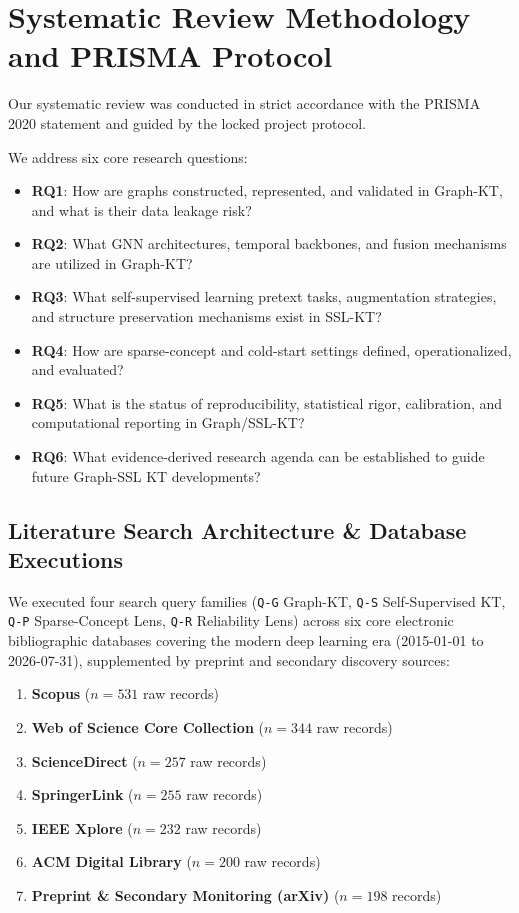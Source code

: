 \documentclass[10pt,journal,compsoc]{IEEEtran}
\begin{document}
\section{Systematic Review Methodology and PRISMA Protocol}
Our systematic review was conducted in strict accordance with the PRISMA 2020 statement and guided by the locked project protocol.

We address six core research questions:
\begin{itemize}
    \item \textbf{RQ1}: How are graphs constructed, represented, and validated in Graph-KT, and what is their data leakage risk?
    \item \textbf{RQ2}: What GNN architectures, temporal backbones, and fusion mechanisms are utilized in Graph-KT?
    \item \textbf{RQ3}: What self-supervised learning pretext tasks, augmentation strategies, and structure preservation mechanisms exist in SSL-KT?
    \item \textbf{RQ4}: How are sparse-concept and cold-start settings defined, operationalized, and evaluated?
    \item \textbf{RQ5}: What is the status of reproducibility, statistical rigor, calibration, and computational reporting in Graph/SSL-KT?
    \item \textbf{RQ6}: What evidence-derived research agenda can be established to guide future Graph-SSL KT developments?
\end{itemize}

\subsection{Literature Search Architecture \& Database Executions}
We executed four search query families (\texttt{Q-G} Graph-KT, \texttt{Q-S} Self-Supervised KT, \texttt{Q-P} Sparse-Concept Lens, \texttt{Q-R} Reliability Lens) across six core electronic bibliographic databases covering the modern deep learning era (2015-01-01 to 2026-07-31), supplemented by preprint and secondary discovery sources:
\begin{enumerate}
    \item \textbf{Scopus} ($n = 531$ raw records)
    \item \textbf{Web of Science Core Collection} ($n = 344$ raw records)
    \item \textbf{ScienceDirect} ($n = 257$ raw records)
    \item \textbf{SpringerLink} ($n = 255$ raw records)
    \item \textbf{IEEE Xplore} ($n = 232$ raw records)
    \item \textbf{ACM Digital Library} ($n = 200$ raw records)
    \item \textbf{Preprint \& Secondary Monitoring (arXiv)} ($n = 198$ records)
\end{enumerate}
\end{document}

